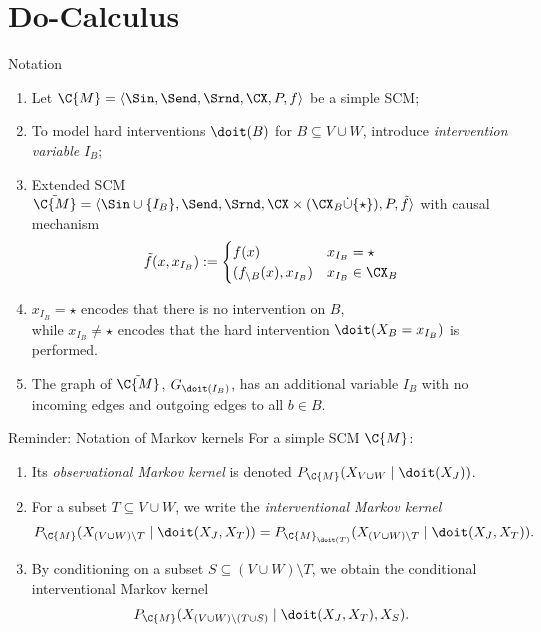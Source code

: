 \part{Do-Calculus}
\frame{\partpage}

\begin{frame}{Notation}
  \begin{enumerate}
    \item Let $\C{M} = \langle \Sin, \Send, \Srnd, \CX, P, f \rangle$ be a simple SCM;
    \item To model hard interventions $\doit(B)$ for $B \subseteq V \cup W$, introduce \emph{intervention variable} $I_B$;
    \item Extended SCM $\tilde{\C{M}} = \langle \Sin \cup \{I_B\}, \Send, \Srnd, \CX \times (\CX_B \dot\cup \{\star\}), P, \tilde{f} \rangle$ with causal mechanism
$$\tilde{f}(x,x_{I_B}) := \begin{cases}
  f(x) & x_{I_B} = \star \\
  (f_{\setminus B}(x), x_{I_B}) & x_{I_B} \in \CX_B
\end{cases}$$
    \item $x_{I_B} = \star$ encodes that there is no intervention on $B$,\\
while $x_{I_B} \ne \star$ encodes that the hard intervention $\doit(X_B = x_{I_B})$ is performed.
\item The graph of $\tilde{\C{M}}$, $G_{\doit(I_B)}$, has an additional variable $I_B$ with no incoming edges
  and outgoing edges to all $b \in B$.
  \end{enumerate}
\end{frame}

\begin{frame}{Reminder: Notation of Markov kernels}
  For a simple SCM $\C{M}$:
  \begin{enumerate}
    \item Its \emph{observational Markov kernel} is denoted $P_{\C{M}}(X_{V\cup W} \mid \doit(X_J))$.
    \item For a subset $T \subseteq V \cup W$, we write the \emph{interventional Markov kernel}
$$P_{\C{M}}(X_{(V\cup W)\setminus T} \mid \doit(X_J,X_T)) = P_{\C{M}_{\doit(T)}}(X_{(V\cup W)\setminus T} \mid \doit(X_J,X_T)).$$
\item By conditioning on a subset $S \subseteq (V \cup W) \setminus T$, we obtain the conditional interventional Markov kernel
$$P_{\C{M}}(X_{(V\cup W)\setminus (T \cup S)} \mid \doit(X_J,X_T), X_S).$$
  \end{enumerate}
\end{frame}


